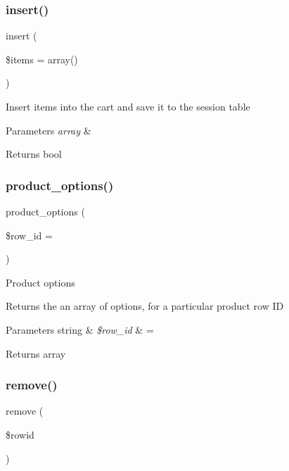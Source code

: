 \subsubsection{\texorpdfstring{insert()}{insert()}}
{\footnotesize\ttfamily insert (\begin{DoxyParamCaption}\item[{}]{\$items = {\ttfamily array()} }\end{DoxyParamCaption})}

Insert items into the cart and save it to the session table


\begin{DoxyParams}{Parameters}
{\em array} & \\
\hline
\end{DoxyParams}
\begin{DoxyReturn}{Returns}
bool 
\end{DoxyReturn}
\mbox{\label{class_c_i___cart_a461e270ceff8b04d40e14e00b9c74447}} 
\subsubsection{\texorpdfstring{product\+\_\+options()}{product\_options()}}
{\footnotesize\ttfamily product\+\_\+options (\begin{DoxyParamCaption}\item[{}]{\$row\+\_\+id = {\ttfamily \textquotesingle{}\textquotesingle{}} }\end{DoxyParamCaption})}

Product options

Returns the an array of options, for a particular product row ID


\begin{DoxyParams}[1]{Parameters}
string & {\em \$row\+\_\+id} & = \textquotesingle{}\textquotesingle{} \\
\hline
\end{DoxyParams}
\begin{DoxyReturn}{Returns}
array 
\end{DoxyReturn}
\mbox{\label{class_c_i___cart_acb40031fae650e22e4a32878c02dfbf7}} 
\subsubsection{\texorpdfstring{remove()}{remove()}}
{\footnotesize\ttfamily remove (\begin{DoxyParamCaption}\item[{}]{\$rowid }\end{DoxyParamCaption})}

